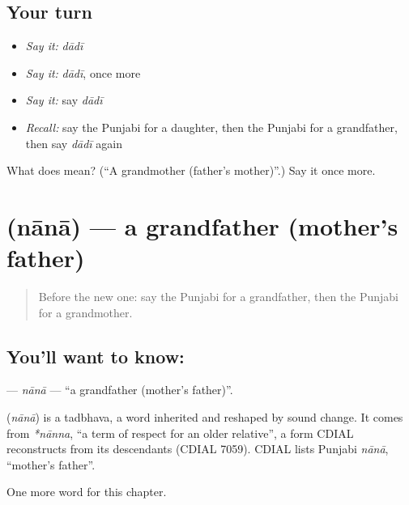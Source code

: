 \subsection*{Your turn}
\begin{itemize}
\raggedright
  \item \emph{Say it:} \emph{dādī}
  \item \emph{Say it:} \emph{dādī}, once more
  \item \emph{Say it:} say \emph{dādī}
  \item \emph{Recall:} say the Punjabi for a daughter, then the Punjabi for a grandfather, then say \emph{dādī} again
\end{itemize}

\begin{tcolorbox}[breakable,colback=teal!4,colframe=teal!35!black,title={Before you move on}]
What does  mean? (\textquotedblleft{}A grandmother (father's mother)\textquotedblright{}.) Say it once more.
\end{tcolorbox}
\section[\texorpdfstring{\pa{ਨਾਨਾ} (nānā)}{ਨਾਨਾ (nānā)}]{ (nānā) — a grandfather (mother's father)}

\label{lesson:PA-C54-nana}



\begin{quote}
Before the new one: say the Punjabi for a grandfather, then the Punjabi for a grandmother.
\end{quote}

\subsection*{You'll want to know: }
\textbf{} — \emph{nānā} — \textquotedblleft{}a grandfather (mother's father)\textquotedblright{}.

\begin{cousinweb}
\textbf{} (\emph{nānā}) is a tadbhava, a word inherited and reshaped by sound change. It comes from \emph{*nānna}, \textquotedblleft{}a term of respect for an older relative\textquotedblright{}, a form CDIAL reconstructs from its descendants (CDIAL 7059). CDIAL lists Punjabi \emph{nānā}, \textquotedblleft{}mother's father\textquotedblright{}.
\end{cousinweb}

\begin{grammarlens}[title={What you've built}]
One more word for this chapter.
\end{grammarlens}

